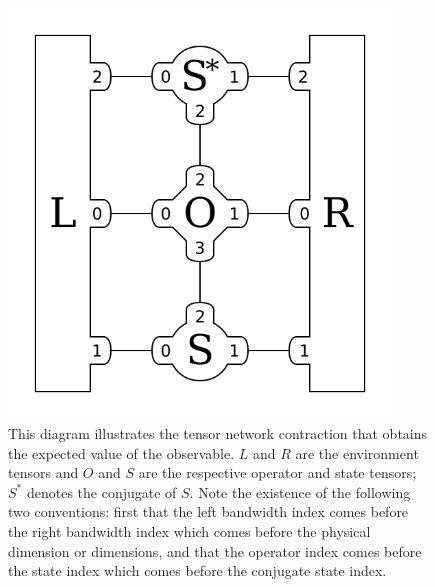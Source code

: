 \documentclass{article}
\newcommand{\diagramwidth}{4in}
\begin{document}
\begin{figure}\begin{center}
\includegraphics[width=\diagramwidth]{drawings/expectation-car}
\caption{\label{fig:expectation-car} This diagram illustrates the tensor network contraction that obtains the expected value of the observable.  $L$ and $R$ are the environment tensors and $O$ and $S$ are the respective operator and state tensors; $S^*$ denotes the conjugate of $S$.  Note the existence of the following two conventions:  first that the left bandwidth index comes before the right bandwidth index which comes before the physical dimension or dimensions, and that the operator index comes before the state index which comes before the conjugate state index.}
\end{center}\end{figure}
\end{document}
